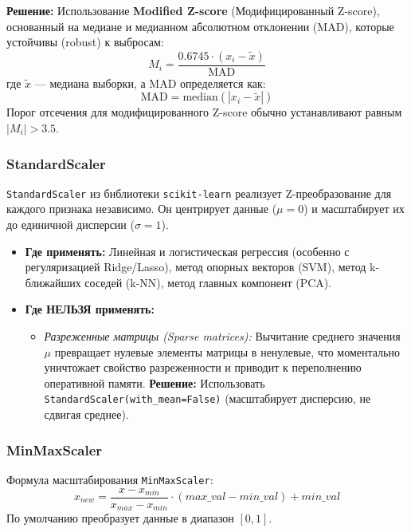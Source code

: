 \documentclass[12pt]{article}
\begin{document}
\textbf{Решение:} Использование \textbf{Modified Z-score} (Модифицированный Z-score), основанный на медиане и медианном абсолютном отклонении (MAD), которые устойчивы (robust) к выбросам:
\begin{equation}
    M_i = \frac{0.6745 \cdot (x_i - \tilde{x})}{\text{MAD}}
\end{equation}
где $\tilde{x}$ --- медиана выборки, а $\text{MAD}$ определяется как:
\begin{equation}
    \text{MAD} = \text{median}(|x_i - \tilde{x}|)
\end{equation}
Порог отсечения для модифицированного Z-score обычно устанавливают равным $|M_i| > 3.5$.

\subsubsection{StandardScaler}

\texttt{StandardScaler} из библиотеки \texttt{scikit-learn} реализует Z-преобразование для каждого признака независимо. Он центрирует данные ($\mu = 0$) и масштабирует их до единичной дисперсии ($\sigma = 1$).

\begin{itemize}
    \item \textbf{Где применять:} Линейная и логистическая регрессия (особенно с регуляризацией Ridge/Lasso), метод опорных векторов (SVM), метод k-ближайших соседей (k-NN), метод главных компонент (PCA).
    \item \textbf{Где НЕЛЬЗЯ применять:}
    \begin{itemize}
        \item \textit{Разреженные матрицы (Sparse matrices):} Вычитание среднего значения $\mu$ превращает нулевые элементы матрицы в ненулевые, что моментально уничтожает свойство разреженности и приводит к переполнению оперативной памяти. \textbf{Решение:} Использовать \texttt{StandardScaler(with\_mean=False)} (масштабирует дисперсию, не сдвигая среднее).
    \end{itemize}
\end{itemize}

\subsubsection{MinMaxScaler}

Формула масштабирования \texttt{MinMaxScaler}:
\begin{equation}
    x_{new} = \frac{x - x_{min}}{x_{max} - x_{min}} \cdot (max\_val - min\_val) + min\_val
\end{equation}
По умолчанию преобразует данные в диапазон $[0, 1]$.
\end{document}
